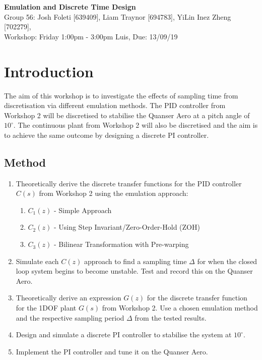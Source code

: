 \documentclass[11pt]{article}
\begin{document}

\clearpage
\setcounter{page}{1}

\begin{center}
\textbf{\Large{Emulation and Discrete Time Design}}\\
Group 56: Josh Foleti [639409], Liam Traynor [694783], YiLin Inez Zheng [702279], \\
Workshop: Friday 1:00pm - 3:00pm Luis, Due: 13/09/19  
\end{center}

\section{Introduction}
The aim of this workshop is to investigate the effects of sampling time from discretisation via different emulation methods. The PID controller from Workshop 2 will be discretised to stabilise the Quanser Aero at a pitch angle of $10^{\circ}$. The continuous plant from Workshop 2 will also be discretised and the aim is to achieve the same outcome by designing a discrete PI controller.   

\subsection{Method}
\begin{enumerate}
    \item %
    Theoretically derive the discrete transfer functions for the PID controller $C(s)$ from Workshop 2 using the emulation approach:
    \begin{enumerate}
        \item %
        $C_1(z)$ - Simple Approach
        \item %
        $C_2(z)$ - Using Step Invariant/Zero-Order-Hold (ZOH)
        \item %
        $C_3(z)$ - Bilinear Transformation with Pre-warping
    \end{enumerate}
    \item %
    Simulate each $C(z)$ approach to find a sampling time $\Delta$ for when the closed loop system begins to become unstable. Test and record this on the Quanser Aero.
    \item %
    Theoretically derive an expression $G(z)$ for the discrete transfer function for the 1DOF plant $G(s)$ from Workshop 2. Use a chosen emulation method and the respective sampling period $\Delta$ from the tested results.
    \item %
    Design and simulate a discrete PI controller to stabilise the system at $10^{\circ}$. 
    \item %
    Implement the PI controller and tune it on the Quanser Aero.
\end{enumerate}
\end{document}
